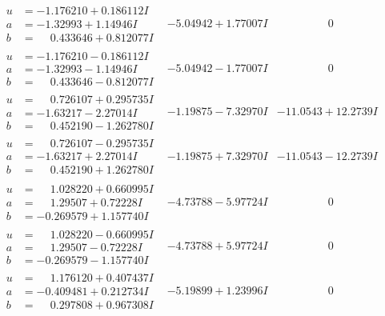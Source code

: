\documentclass[1p]{elsarticle_modified}
\theoremstyle{definition}
\begin{document}
$$\begin{array}{c|c|c}
\begin{aligned}
u &= -1.176210 + 0.186112 I \\
a &= -1.32993 + 1.14946 I \\
b &= \phantom{-}0.433646 + 0.812077 I\end{aligned}
 & -5.04942 + 1.77007 I & \phantom{-0.000000 } 0 \\ \hline\begin{aligned}
u &= -1.176210 - 0.186112 I \\
a &= -1.32993 - 1.14946 I \\
b &= \phantom{-}0.433646 - 0.812077 I\end{aligned}
 & -5.04942 - 1.77007 I & \phantom{-0.000000 } 0 \\ \hline\begin{aligned}
u &= \phantom{-}0.726107 + 0.295735 I \\
a &= -1.63217 - 2.27014 I \\
b &= \phantom{-}0.452190 - 1.262780 I\end{aligned}
 & -1.19875 - 7.32970 I & -11.0543 + 12.2739 I \\ \hline\begin{aligned}
u &= \phantom{-}0.726107 - 0.295735 I \\
a &= -1.63217 + 2.27014 I \\
b &= \phantom{-}0.452190 + 1.262780 I\end{aligned}
 & -1.19875 + 7.32970 I & -11.0543 - 12.2739 I \\ \hline\begin{aligned}
u &= \phantom{-}1.028220 + 0.660995 I \\
a &= \phantom{-}1.29507 + 0.72228 I \\
b &= -0.269579 + 1.157740 I\end{aligned}
 & -4.73788 - 5.97724 I & \phantom{-0.000000 } 0 \\ \hline\begin{aligned}
u &= \phantom{-}1.028220 - 0.660995 I \\
a &= \phantom{-}1.29507 - 0.72228 I \\
b &= -0.269579 - 1.157740 I\end{aligned}
 & -4.73788 + 5.97724 I & \phantom{-0.000000 } 0 \\ \hline\begin{aligned}
u &= \phantom{-}1.176120 + 0.407437 I \\
a &= -0.409481 + 0.212734 I \\
b &= \phantom{-}0.297808 + 0.967308 I\end{aligned}
 & -5.19899 + 1.23996 I & \phantom{-0.000000 } 0 \\ \hline\begin{aligned}

\end{aligned}
\end{array}$$
\end{document}
